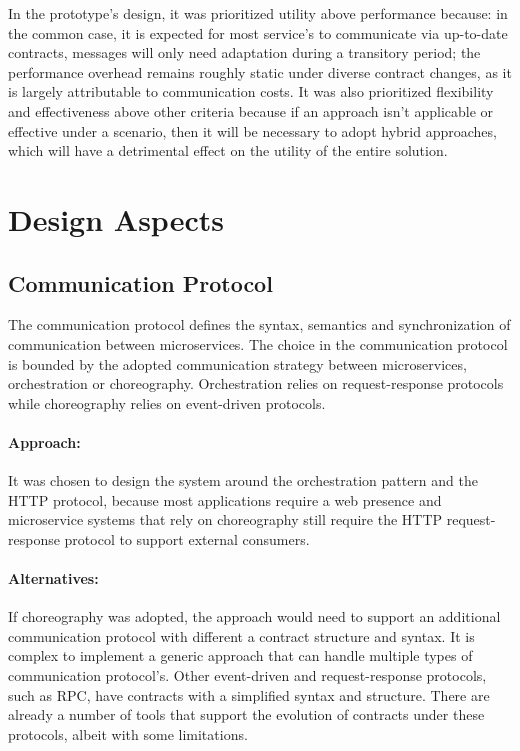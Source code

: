 In the prototype's design, it was prioritized utility above performance because:
in the common case, it is expected for most service's to communicate via up-to-date contracts, messages will only need adaptation during a transitory period;
the performance overhead remains roughly static under diverse contract changes, as it is largely attributable to communication costs.
It was also prioritized flexibility and effectiveness above other criteria because if an approach isn't applicable or effective under a scenario,
then it will be necessary to adopt hybrid approaches, which will have a detrimental effect on the utility of the entire solution.

\section{Design Aspects} %
\label{sec:design_aspects}

\subsection{Communication Protocol} %
\label{sec:communication_protocol}

The communication protocol defines the syntax, semantics and synchronization of communication between microservices.
The choice in the communication protocol is bounded by the adopted communication strategy between microservices, orchestration or choreography.
Orchestration relies on request-response protocols while choreography relies on event-driven protocols.

\paragraph{Approach:}
It was chosen to design the system around the orchestration pattern and the HTTP protocol,
because most applications require a web presence and microservice systems that
rely on choreography still require the HTTP request-response protocol to support external consumers.

\paragraph{Alternatives:}
If choreography was adopted, the approach would need to support an additional communication protocol with different a contract structure and syntax.
It is complex to implement a generic approach that can handle multiple types of communication protocol's.
Other event-driven and request-response protocols, such as RPC, have contracts with a simplified
syntax and structure.
There are already a number of tools that support the evolution of contracts under these protocols, albeit with some limitations.

